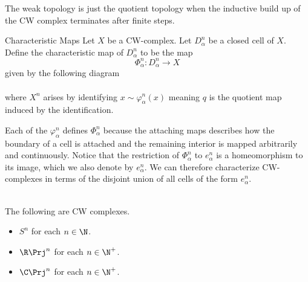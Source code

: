 \documentclass[a4paper]{article}
\begin{document}
The weak topology is just the quotient topology when the inductive build up of the CW complex terminates after finite steps. 

\begin{defn}{Characteristic Maps}{} Let $X$ be a CW-complex. Let $D_\alpha^n$ be a closed cell of $X$. Define the characteristic map of $D_\alpha^n$ to be the map $$\Phi_\alpha^n:D_\alpha^n\to X$$ given by the following diagram \\
\\
where $X^n$ arises by identifying $x\sim\varphi_\alpha^n(x)$ meaning $q$ is the quotient map induced by the identification. 
\end{defn}

Each of the $\varphi_\alpha^n$ defines $\Phi_\alpha^n$ because the attaching maps describes how the boundary of a cell is attached and the remaining interior is mapped arbitrarily and continuously. Notice that the restriction of $\Phi_\alpha^n$ to $e_\alpha^n$ is a homeomorphism to its image, which we also denote by $e_\alpha^n$. We can therefore characterize CW-complexes in terms of the disjoint union of all cells of the form $e_\alpha^n$. 

\begin{eg}{}{}\\
The following are CW complexes. 
\begin{itemize}
\item $S^n$ for each $n\in\N$. 
\item $\R\Prj^n$ for each $n\in\N^+$. 
\item $\C\Prj^n$ for each $n\in\N^+$. 
\end{itemize}
\end{eg}
\end{document}
